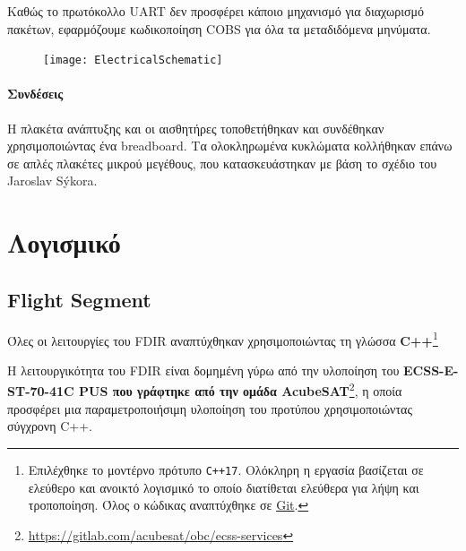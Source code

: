 \documentclass[a4paper,nobib]{tufte-book}
\begin{document}
Καθώς το πρωτόκολλο \acs{UART} δεν προσφέρει κάποιο μηχανισμό για διαχωρισμό πακέτων, εφαρμόζουμε κωδικοποίηση \acs{COBS} \autocite{cheshire_consistent_overhead_1997} για όλα τα μεταδιδόμενα μηνύματα.

\begin{figure}[h]
	\texttt{[image: ElectricalSchematic]}
	\label{fig:schematic}
\end{figure}

\paragraph{Συνδέσεις}
Η πλακέτα ανάπτυξης και οι αισθητήρες τοποθετήθηκαν και συνδέθηκαν χρησιμοποιώντας ένα breadboard. Τα ολοκληρωμένα κυκλώματα κολλήθηκαν επάνω σε απλές πλακέτες μικρού μεγέθους, που κατασκευάστηκαν με βάση το σχέδιο του Jaroslav Sýkora.

\section{Λογισμικό}

\subsection{Flight Segment}

Όλες οι λειτουργίες του \ac{FDIR} αναπτύχθηκαν χρησιμοποιώντας τη γλώσσα \textbf{C++}\footnote{Επιλέχθηκε το μοντέρνο πρότυπο \texttt{C++17}. Ολόκληρη η εργασία βασίζεται σε ελεύθερο και ανοικτό λογισμικό το οποίο διατίθεται ελεύθερα για λήψη και τροποποίηση. Όλος ο κώδικας αναπτύχθηκε σε \href{https://git-scm.com/}{Git}.}
	
	Η λειτουργικότητα του \ac{FDIR} είναι δομημένη γύρω από την υλοποίηση του \textbf{ECSS-E-ST-70-41C \ac{PUS} που γράφτηκε από την ομάδα AcubeSAT}\footnote{\url{https://gitlab.com/acubesat/obc/ecss-services}}, η οποία προσφέρει μια παραμετροποιήσιμη υλοποίηση του προτύπου χρησιμοποιώντας σύγχρονη C++.
	
\end{document}
